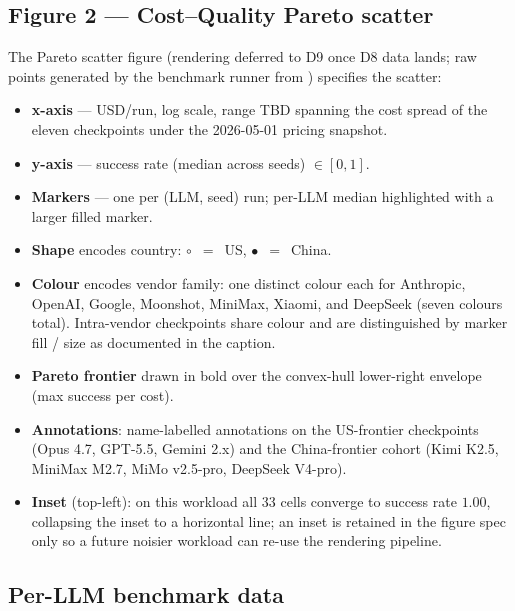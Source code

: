 \subsection{Figure 2 --- Cost--Quality Pareto scatter}
\label{sec:results-pareto-fig}

The Pareto scatter figure (rendering deferred to D9 once D8 data
lands; raw points generated by the benchmark runner from
) specifies the scatter:

\begin{itemize}
  \item \textbf{x-axis} --- USD/run, log scale, range TBD spanning
    the cost spread of the eleven checkpoints under the
    2026-05-01 pricing snapshot.
  \item \textbf{y-axis} --- success rate (median across seeds)
    $\in[0,1]$.
  \item \textbf{Markers} --- one per (LLM, seed) run; per-LLM
    median highlighted with a larger filled marker.
  \item \textbf{Shape} encodes country: $\circ$~$=$~US,
    $\bullet$~$=$~China.
  \item \textbf{Colour} encodes vendor family: one distinct colour
    each for Anthropic, OpenAI, Google, Moonshot, MiniMax, Xiaomi,
    and DeepSeek (seven colours total). Intra-vendor checkpoints
    share colour and are distinguished by marker fill / size as
    documented in the caption.
  \item \textbf{Pareto frontier} drawn in bold over the convex-hull
    lower-right envelope (max success per cost).
  \item \textbf{Annotations}: name-labelled annotations on the
    US-frontier checkpoints (Opus 4.7, GPT-5.5, Gemini 2.x) and
    the China-frontier cohort (Kimi K2.5, MiniMax M2.7, MiMo
    v2.5-pro, DeepSeek V4-pro).
  \item \textbf{Inset} (top-left): on this workload all 33 cells
    converge to success rate $1.00$, collapsing the inset to a
    horizontal line; an inset is retained in the figure spec only
    so a future noisier workload can re-use the rendering pipeline.
\end{itemize}


\subsection{Per-LLM benchmark data}
\label{sec:results-table}


